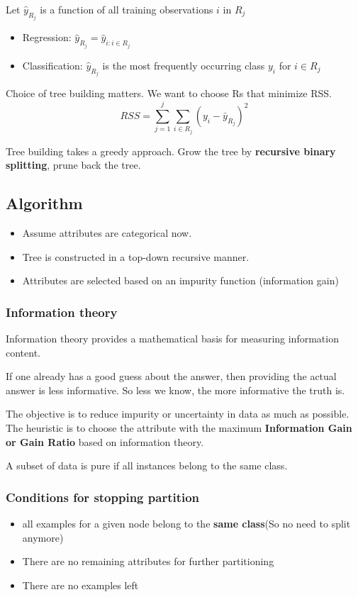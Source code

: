 \documentclass[letterpaper,12pt]{article}
\begin{document}
Let $\hat{y}_{R_j}$ is a function of all training observations $i$ in $R_j$
\begin{itemize}
    \item Regression: $\hat{y}_{R_j} = \hat{y}_{i:i\in R_j}$
    \item Classification: $\hat{y}_{R_j}$ is the most frequently occurring class $y_i$
          for $i \in R_j$
\end{itemize}

Choice of tree building matters. We want to choose Rs that minimize RSS.
\[
    RSS = \sum_{j=1}^{j}\sum_{i\in R_j}(y_i-\bar{y}_{R_j})^2
\]

Tree building takes a greedy approach. Grow the tree by \textbf{recursive
    binary splitting}, prune back the tree.

\subsection{Algorithm}
\begin{itemize}
    \item Assume attributes are categorical now.
    \item Tree is constructed in a top-down recursive manner.
    \item Attributes are selected based on an impurity function (information gain)
\end{itemize}
\subsubsection{Information theory}

Information theory provides a mathematical basis for measuring information
content.

If one already has a good guess about the answer, then providing the actual
answer is less informative. So less we know, the more informative the truth is.

The objective is to reduce impurity or uncertainty in data as much as possible.
The heuristic is to choose the attribute with the maximum \textbf{Information
    Gain or Gain Ratio} based on information theory.

A subset of data is pure if all instances belong to the same class.
\subsubsection{Conditions for stopping partition}
\begin{itemize}
    \item all examples for a given node belong to the \textbf{same class}(So no need to
          split anymore)
    \item There are no remaining attributes for further partitioning
    \item There are no examples left
\end{itemize}
\end{document}
